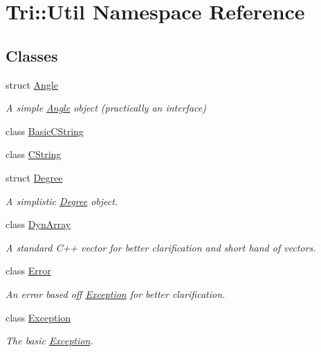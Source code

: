 \hypertarget{namespace_tri_1_1_util}{}\section{Tri\+:\+:Util Namespace Reference}
\label{namespace_tri_1_1_util}
\subsection*{Classes}
\begin{DoxyCompactItemize}
\item 
struct \hyperlink{struct_tri_1_1_util_1_1_angle}{Angle}
\begin{DoxyCompactList}\small\item\em A simple \hyperlink{struct_tri_1_1_util_1_1_angle}{Angle} object (practically an interface) \end{DoxyCompactList}\item 
class \hyperlink{class_tri_1_1_util_1_1_basic_c_string}{Basic\+C\+String}
\item 
class \hyperlink{class_tri_1_1_util_1_1_c_string}{C\+String}
\item 
struct \hyperlink{struct_tri_1_1_util_1_1_degree}{Degree}
\begin{DoxyCompactList}\small\item\em A simplistic \hyperlink{struct_tri_1_1_util_1_1_degree}{Degree} object. \end{DoxyCompactList}\item 
class \hyperlink{class_tri_1_1_util_1_1_dyn_array}{Dyn\+Array}
\begin{DoxyCompactList}\small\item\em A standard C++ vector for better clarification and short hand of vectors. \end{DoxyCompactList}\item 
class \hyperlink{class_tri_1_1_util_1_1_error}{Error}
\begin{DoxyCompactList}\small\item\em An error based off \hyperlink{class_tri_1_1_util_1_1_exception}{Exception} for better clarification. \end{DoxyCompactList}\item 
class \hyperlink{class_tri_1_1_util_1_1_exception}{Exception}
\begin{DoxyCompactList}\small\item\em The basic \hyperlink{class_tri_1_1_util_1_1_exception}{Exception}. \end{DoxyCompactList}\item 

\end{DoxyCompactItemize}
